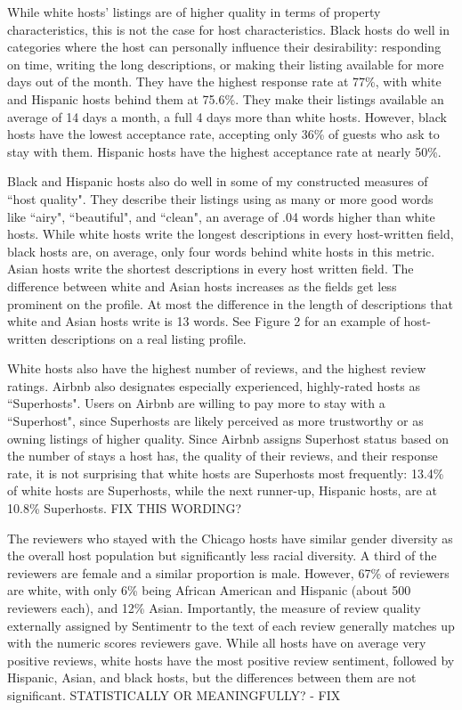 While white hosts' listings are of higher quality in terms of property characteristics, this is not the case for host characteristics. Black hosts do well in categories where the host can personally influence their desirability: responding on time, writing the long descriptions, or making their listing available for more days out of the month. They have the highest response rate at 77\%, with white and Hispanic hosts behind them at 75.6\%. They make their listings available an average of 14 days a month, a full 4 days more than white hosts. However, black hosts have the lowest acceptance rate, accepting only 36\% of guests who ask to stay with them. Hispanic hosts have the highest acceptance rate at nearly 50\%. 

Black and Hispanic hosts also do well in some of my constructed measures of ``host quality". They describe their listings using as many or more good words like ``airy", ``beautiful", and ``clean", an average of .04 words higher than white hosts. While white hosts write the longest descriptions in every host-written field, black hosts are, on average, only four words behind white hosts in this metric. Asian hosts write the shortest descriptions in every host written field. The difference between white and Asian hosts increases as the fields get less prominent on the profile. At most the difference in the length of descriptions that white and Asian hosts write is 13 words. See Figure 2 for an example of host-written descriptions on a real listing profile. 

White hosts also have the highest number of reviews, and the highest review ratings. Airbnb also designates especially experienced, highly-rated hosts as ``Superhosts". Users on Airbnb are willing to pay more to stay with a ``Superhost", since Superhosts are likely perceived as more trustworthy or as owning listings of higher quality. Since Airbnb assigns Superhost status based on the number of stays a host has, the quality of their reviews, and their response rate, it is not surprising that white hosts are Superhosts most frequently: 13.4\% of white hosts are Superhosts, while the next runner-up, Hispanic hosts, are at 10.8\% Superhosts. FIX THIS WORDING?

The reviewers who stayed with the Chicago hosts have similar gender diversity as the overall host population but significantly less racial diversity. A third of the reviewers are female and a similar proportion is male. However, 67\% of reviewers are white, with only 6\% being African American and Hispanic (about 500 reviewers each), and 12\% Asian. Importantly, the measure of review quality externally assigned by Sentimentr to the text of each review generally matches up with the numeric scores reviewers gave. While all hosts have on average very positive reviews, white hosts have the most positive review sentiment, followed by Hispanic, Asian, and black hosts, but the differences between them are not significant. STATISTICALLY OR MEANINGFULLY? - FIX

